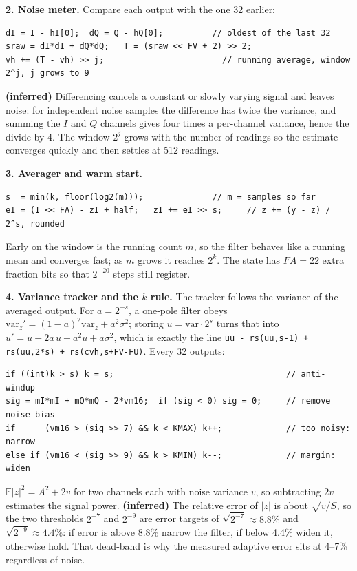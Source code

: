 \documentclass[10pt,a4paper]{article}
\renewcommand{\c}[1]{\texttt{#1}}
\begin{document}
\textbf{2. Noise meter.} Compare each output with the one 32 earlier:
\begin{lstlisting}
dI = I - hI[0];  dQ = Q - hQ[0];          // oldest of the last 32
sraw = dI*dI + dQ*dQ;   T = (sraw << FV + 2) >> 2;
vh += (T - vh) >> j;                        // running average, window 2^j, j grows to 9
\end{lstlisting}
\textbf{(inferred)} Differencing cancels a constant or slowly varying signal and leaves noise: for independent noise samples the difference has twice the variance, and summing the $I$ and $Q$ channels gives four times a per-channel variance, hence the divide by 4. The window $2^j$ grows with the number of readings so the estimate converges quickly and then settles at 512 readings.

\textbf{3. Averager and warm start.}
\begin{lstlisting}
s  = min(k, floor(log2(m)));              // m = samples so far
eI = (I << FA) - zI + half;   zI += eI >> s;     // z += (y - z) / 2^s, rounded
\end{lstlisting}
Early on the window is the running count $m$, so the filter behaves like a running mean and converges fast; as $m$ grows it reaches $2^k$. The state has $FA=22$ extra fraction bits so that $2^{-20}$ steps still register.

\textbf{4. Variance tracker and the $k$ rule.} The tracker follows the variance of the averaged output. For $a=2^{-s}$, a one-pole filter obeys $\mathrm{var}_z'=(1-a)^2\mathrm{var}_z+a^2\sigma^2$; storing $u=\mathrm{var}\cdot2^s$ turns that into $u'=u-2a\,u+a^2u+a\sigma^2$, which is exactly the line \c{uu - rs(uu,s-1) + rs(uu,2*s) + rs(cvh,s+FV-FU)}. Every 32 outputs:
\begin{lstlisting}
if ((int)k > s) k = s;                                   // anti-windup
sig = mI*mI + mQ*mQ - 2*vm16;  if (sig < 0) sig = 0;     // remove noise bias
if      (vm16 > (sig >> 7) && k < KMAX) k++;             // too noisy: narrow
else if (vm16 < (sig >> 9) && k > KMIN) k--;             // margin: widen
\end{lstlisting}
$\mathbb E|z|^2=A^2+2v$ for two channels each with noise variance $v$, so subtracting $2v$ estimates the signal power. \textbf{(inferred)} The relative error of $|z|$ is about $\sqrt{v/S}$, so the two thresholds $2^{-7}$ and $2^{-9}$ are error targets of $\sqrt{2^{-7}}\approx8.8\%$ and $\sqrt{2^{-9}}\approx4.4\%$: if error is above 8.8\% narrow the filter, if below 4.4\% widen it, otherwise hold. That dead-band is why the measured adaptive error sits at 4--7\% regardless of noise.
\end{document}
